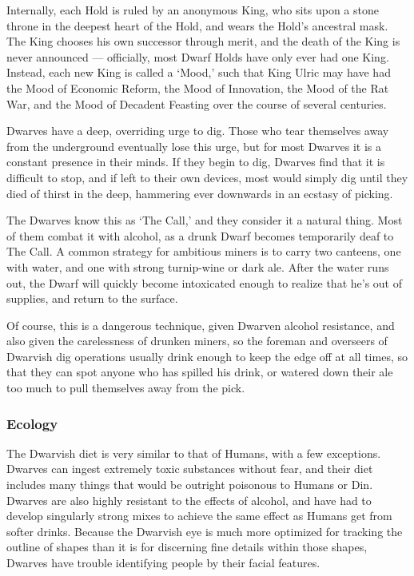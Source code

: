 \documentclass[oneside,11pt,english]{book}
\begin{document}
 
Internally, each Hold is ruled by an anonymous King, who sits upon a stone throne in the deepest heart of 
the Hold, and wears the Hold's ancestral mask. The King chooses his own successor through merit, and 
the death of the King is never announced — officially, most Dwarf Holds have only ever had one King. 
Instead, each new King is called a ‘Mood,’ such that King Ulric may have had the Mood of Economic 
Reform, the Mood of Innovation, the Mood of the Rat War, and the Mood of Decadent Feasting over the 
course of several centuries. 

 
Dwarves have a deep, overriding urge to dig. Those who tear themselves away from the underground 
eventually lose this urge, but for most Dwarves it is a constant presence in their minds. If they begin to 
dig, Dwarves find that it is difficult to stop, and if left to their own devices, most would simply dig until 
they died of thirst in the deep, hammering ever downwards in an ecstasy of picking. 


The Dwarves know this as ‘The Call,’ and they consider it a natural thing. Most of them combat it with 
alcohol, as a drunk Dwarf becomes temporarily deaf to The Call. A common strategy for ambitious 
miners is to carry two canteens, one with water, and one with strong turnip-wine or dark ale. After the 
water runs out, the Dwarf will quickly become intoxicated enough to realize that he's out of supplies, and 
return to the surface. 

 
Of course, this is a dangerous technique, given Dwarven alcohol resistance, and also given the 
carelessness of drunken miners, so the foreman and overseers of Dwarvish dig operations usually drink 
enough to keep the edge off at all times, so that they can spot anyone who has spilled his drink, or 
watered down their ale too much to pull themselves away from the pick. 
\subsubsection*{Ecology} 
The Dwarvish diet is very similar to that of Humans, with a few exceptions. Dwarves can ingest 
extremely toxic substances without fear, and their diet includes many things that would be outright 
poisonous to Humans or Din. Dwarves are also highly resistant to the effects of alcohol, and have had to 
develop singularly strong mixes to achieve the same effect as Humans get from softer drinks. Because the 
Dwarvish eye is much more optimized for tracking the outline of shapes than it is for discerning fine 
details within those shapes, Dwarves have trouble identifying people by their facial features. 
\end{document}
